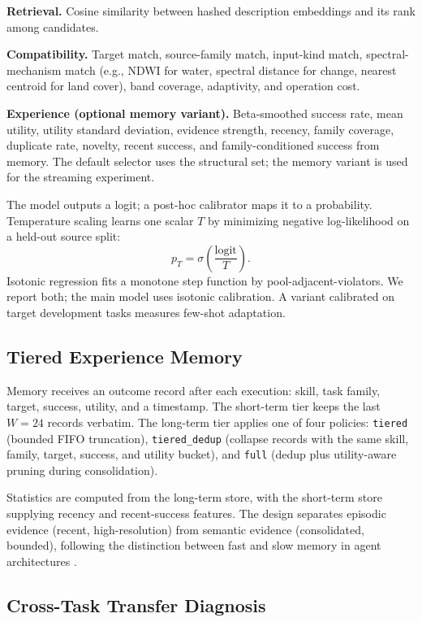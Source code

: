 \documentclass[journal]{IEEEtran}
\begin{document}
\textbf{Retrieval.} Cosine similarity between hashed description embeddings and its rank among candidates.

\textbf{Compatibility.} Target match, source-family match, input-kind match, spectral-mechanism match (e.g., NDWI for water, spectral distance for change, nearest centroid for land cover), band coverage, adaptivity, and operation cost.

\textbf{Experience (optional memory variant).} Beta-smoothed success rate, mean utility, utility standard deviation, evidence strength, recency, family coverage, duplicate rate, novelty, recent success, and family-conditioned success from memory. The default selector uses the structural set; the memory variant is used for the streaming experiment.

The model outputs a logit; a post-hoc calibrator maps it to a probability. Temperature scaling learns one scalar $T$ by minimizing negative log-likelihood on a held-out source split:
\begin{equation}
p_T=\sigma\!\left(\frac{\mathrm{logit}}{T}\right).
\end{equation}
Isotonic regression fits a monotone step function by pool-adjacent-violators. We report both; the main model uses isotonic calibration. A variant calibrated on target development tasks measures few-shot adaptation.

\subsection{Tiered Experience Memory}

Memory receives an outcome record after each execution: skill, task family, target, success, utility, and a timestamp. The short-term tier keeps the last $W=24$ records verbatim. The long-term tier applies one of four policies: \texttt{tiered} (bounded FIFO truncation), \texttt{tiered\_dedup} (collapse records with the same skill, family, target, success, and utility bucket), and \texttt{full} (dedup plus utility-aware pruning during consolidation).

Statistics are computed from the long-term store, with the short-term store supplying recency and recent-success features. The design separates episodic evidence (recent, high-resolution) from semantic evidence (consolidated, bounded), following the distinction between fast and slow memory in agent architectures \cite{memgpt,park}.

\subsection{Cross-Task Transfer Diagnosis}
\end{document}
